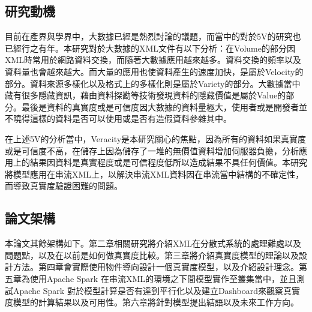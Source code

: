\subsection{研究動機}
目前在產界與學界中，大數據已經是熱烈討論的議題，而當中的對於5V的研究也已經行之有年。本研究對於大數據的XML文件有以下分析：在Volume的部分因XML時常用於網路資料交換，而隨著大數據應用越來越多。資料交換的頻率以及資料量也會越來越大。而大量的應用也使資料產生的速度加快，是屬於Velocity的部分。資料來源多樣化以及格式上的多樣化則是屬於Variety的部分。大數據當中藏有很多隱藏資訊，藉由資料探勘等技術發現資料的隱藏價值是屬於Value的部分。最後是資料的真實度或是可信度因大數據的資料量極大，使用者或是開發者並不曉得這樣的資料是否可以使用或是否有造假資料參雜其中。\\\par

在上述5V的分析當中，Veracity是本研究關心的焦點，因為所有的資料如果真實度或是可信度不高，在儲存上因為儲存了一堆的無價值資料增加伺服器負擔，分析應用上的結果因資料是真實程度或是可信程度低所以造成結果不具任何價值。本研究將模型應用在串流XML上，以解決串流XML資料因在串流當中結構的不確定性，而導致真實度驗證困難的問題。

\subsection{論文架構}
本論文其餘架構如下。第二章相關研究將介紹XML在分散式系統的處理難處以及問題點，以及在以前是如何做真實度比較。第三章將介紹真實度模型的理論以及設計方法。第四章會實際使用物件導向設計一個真實度模型，以及介紹設計理念。第五章為使用Apache Spark 在串流XML的環境之下間模型實作至叢集當中，並且測試Apache Spark 對於模型計算是否有達到平行化以及建立Dashboard來觀察真實度模型的計算結果以及可用性。第六章將針對模型提出結語以及未來工作方向。
